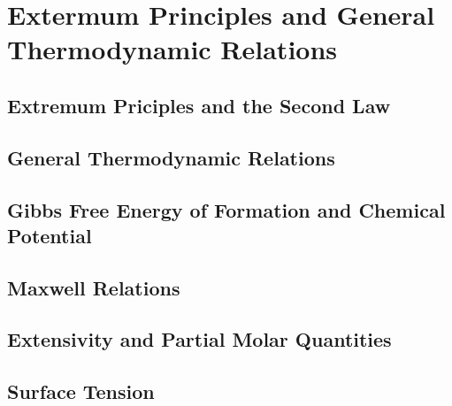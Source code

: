 \chapter{Extermum Principles and General Thermodynamic Relations}
\section{Extremum Priciples and the Second Law}
\section{General Thermodynamic Relations}
\section{Gibbs Free Energy of Formation and Chemical Potential}
\section{Maxwell Relations}
\section{Extensivity and Partial Molar Quantities}
\section{Surface Tension}